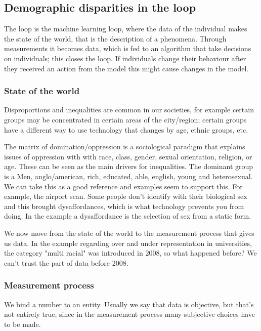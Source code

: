 \subsection{Demographic disparities in the loop}
The loop is the machine learning loop, where the data of the individual makes the state of the world, that is the description of a phenomena. Through measurements it becomes data, which is fed to an algorithm that take decisions on individuals; this closes the loop. If individuals change their behaviour after they received an action from the model this might cause changes in the model. 

\subsubsection{State of the world}
Disproportions and inequalities are common in our societies, for example certain groups may be concentrated in certain areas of the city/region; certain groups have a different way to use technology that changes by age, ethnic groups, etc. 

The matrix of domination/oppression is a sociological paradigm that explains issues of oppression with with race, class, gender, sexual orientation, religion, or age. These can be seen as the main drivers for inequalities. The dominant group is a Men, anglo/american, rich, educated, able, english, young and heterosexual. We can take this as a good reference and examples seem to support this. For example, the airport scan. Some people don't identify with their biological sex and this brought dysaffordances, which is what technology prevents you from doing. In the example a dysaffordance is the selection of sex from a static form.

We now move from the state of the world to the measurement process that gives us data. In the example regarding over and under representation in universities, the category "multi racial" was introduced in 2008, so what happened before? We can't trust the part of data before 2008. 

\subsubsection{Measurement process} 
We bind a number to an entity. Usually we say that data is objective, but that's not entirely true, since in the measurement process many subjective choices have to be made.


